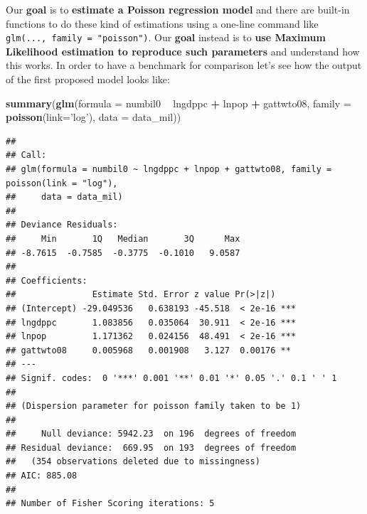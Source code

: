\documentclass[]{book}
\newenvironment{Shaded}{\begin{snugshade}}{\end{snugshade}}
\newcommand{\KeywordTok}[1]{\textcolor[rgb]{0.13,0.29,0.53}{\textbf{#1}}}
\newcommand{\DataTypeTok}[1]{\textcolor[rgb]{0.13,0.29,0.53}{#1}}
\newcommand{\DecValTok}[1]{\textcolor[rgb]{0.00,0.00,0.81}{#1}}
\newcommand{\StringTok}[1]{\textcolor[rgb]{0.31,0.60,0.02}{#1}}
\newcommand{\OperatorTok}[1]{\textcolor[rgb]{0.81,0.36,0.00}{\textbf{#1}}}
\newcommand{\NormalTok}[1]{#1}
\begin{document}
\begin{Shaded}
\end{Shaded}

Our \textbf{goal} is to \textbf{estimate a Poisson regression model} and
there are built-in functions to do these kind of estimations using a
one-line command like \texttt{glm(...,\ family\ =\ "poisson")}. Our
\textbf{goal} instead is to \textbf{use Maximum Likelihood estimation to
reproduce such parameters} and understand how this works. In order to
have a benchmark for comparison let's see how the output of the first
proposed model looks like:

\begin{Shaded}
\begin{Highlighting}[]
\KeywordTok{summary}\NormalTok{(}\KeywordTok{glm}\NormalTok{(}\DataTypeTok{formula =}\NormalTok{ numbil0 }\OperatorTok{~}\StringTok{ }\NormalTok{lngdppc }\OperatorTok{+}\StringTok{ }\NormalTok{lnpop }\OperatorTok{+}\StringTok{ }\NormalTok{gattwto08, }\DataTypeTok{family =} \KeywordTok{poisson}\NormalTok{(}\DataTypeTok{link=}\StringTok{'log'}\NormalTok{), }\DataTypeTok{data =}\NormalTok{ data_mil))}
\end{Highlighting}
\end{Shaded}

\begin{verbatim}
##
## Call:
## glm(formula = numbil0 ~ lngdppc + lnpop + gattwto08, family = poisson(link = "log"),
##     data = data_mil)
##
## Deviance Residuals:
##     Min       1Q   Median       3Q      Max
## -8.7615  -0.7585  -0.3775  -0.1010   9.0587
##
## Coefficients:
##               Estimate Std. Error z value Pr(>|z|)
## (Intercept) -29.049536   0.638193 -45.518  < 2e-16 ***
## lngdppc       1.083856   0.035064  30.911  < 2e-16 ***
## lnpop         1.171362   0.024156  48.491  < 2e-16 ***
## gattwto08     0.005968   0.001908   3.127  0.00176 **
## ---
## Signif. codes:  0 '***' 0.001 '**' 0.01 '*' 0.05 '.' 0.1 ' ' 1
##
## (Dispersion parameter for poisson family taken to be 1)
##
##     Null deviance: 5942.23  on 196  degrees of freedom
## Residual deviance:  669.95  on 193  degrees of freedom
##   (354 observations deleted due to missingness)
## AIC: 885.08
##
## Number of Fisher Scoring iterations: 5
\end{verbatim}
\end{document}

